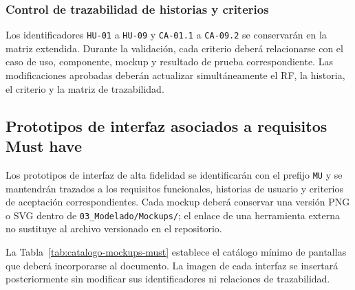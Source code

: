 \documentclass[12pt,a4paper]{article}
\begin{document}
\subsubsection{Control de trazabilidad de historias y criterios}

Los identificadores \texttt{HU-01} a \texttt{HU-09} y \texttt{CA-01.1} a \texttt{CA-09.2} se conservarán en la matriz extendida. Durante la validación, cada criterio deberá relacionarse con el caso de uso, componente, mockup y resultado de prueba correspondiente. Las modificaciones aprobadas deberán actualizar simultáneamente el RF, la historia, el criterio y la matriz de trazabilidad.




\subsection{Prototipos de interfaz asociados a requisitos Must have}

Los prototipos de interfaz de alta fidelidad se identificarán con el prefijo \texttt{MU} y se mantendrán trazados a los requisitos funcionales, historias de usuario y criterios de aceptación correspondientes. Cada mockup deberá conservar una versión PNG o SVG dentro de \texttt{03\_Modelado/Mockups/}; el enlace de una herramienta externa no sustituye al archivo versionado en el repositorio.

La Tabla~\ref{tab:catalogo-mockups-must} establece el catálogo mínimo de pantallas que deberá incorporarse al documento. La imagen de cada interfaz se insertará posteriormente sin modificar sus identificadores ni relaciones de trazabilidad.
\end{document}
